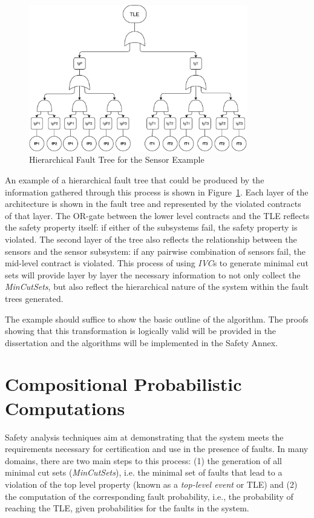 \begin{figure}[h!]
	\centering
	\includegraphics[trim=0 0 0 0,clip,width=0.85\textwidth]{images/ftSensor.pdf}
	\caption{Hierarchical Fault Tree for the Sensor Example}
	\label{fig:ftSensor}
\end{figure}

An example of a hierarchical fault tree that could be produced by the information gathered through this process is shown in Figure~\ref{fig:ftSensor}. Each layer of the architecture is shown in the fault tree and represented by the violated contracts of that layer. The OR-gate between the lower level contracts and the TLE reflects the safety property itself: if either of the subsystems fail, the safety property is violated. The second layer of the tree also reflects the relationship between the sensors and the sensor subsystem: if any pairwise combination of sensors fail, the mid-level contract is violated. This process of using \textit{IVC}s to generate minimal cut sets will provide layer by layer the necessary information to not only collect the \textit{MinCutSets}, but also reflect the hierarchical nature of the system within the fault trees generated.

The example should suffice to show the basic outline of the algorithm. The proofs showing that this transformation is logically valid will be provided in the dissertation and the algorithms will be implemented in the Safety Annex.  


\section{Compositional Probabilistic Computations}
Safety analysis techniques aim at demonstrating that the system meets the requirements necessary for certification and use in the presence of faults. In many domains, there are two main steps to this process: (1) the generation of all minimal cut sets (\textit{MinCutSets}), i.e. the minimal set of faults that lead to a violation of the top level property (known as a \textit{top-level event} or TLE) and (2) the computation of the corresponding fault probability, i.e., the probability of reaching the TLE, given probabilities for the faults in the system. 

